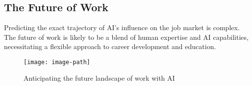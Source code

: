 \subsection{The Future of Work}
Predicting the exact trajectory of AI's influence on the job market is complex. The future of work is likely to be a blend of human expertise and AI capabilities, necessitating a flexible approach to career development and education.

\begin{figure}[hbt!]
 \centering
 \texttt{[image: image-path]}
 \caption{Anticipating the future landscape of work with AI}
 \label{fig:future-work}
\end{figure}
\FloatBarrier